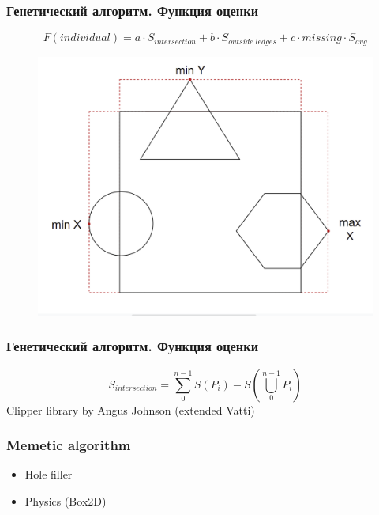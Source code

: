 \documentclass[10pt, unicode]{beamer}
\begin{document}
    \begin{frame}
        \frametitle{Генетический алгоритм. Функция оценки}
        \[
            F\left(individual\right) = a \cdot S_{intersection} + b \cdot S_{outside\;ledges} + c \cdot missing \cdot S_{avg}
        \]
        \begin{figure}[H]
            \centering
            \includegraphics[scale=0.25]{ledges.png}
        \end{figure}
    \end{frame}
    \begin{frame}
        \frametitle{Генетический алгоритм. Функция оценки}
        \[
            S_{intersection} = \sum\limits_{0}^{n - 1}S\left(P_i\right) - S\left(\bigcup\limits_{0}^{n - 1}P_i\right)
        \]
        Clipper library by Angus Johnson (extended Vatti)
    \end{frame}
    \begin{frame}
        \frametitle{Memetic algorithm}
        \begin{itemize}
            \item Hole filler
            \item Physics (Box2D)
        \end{itemize}
    \end{frame}
\end{document}

